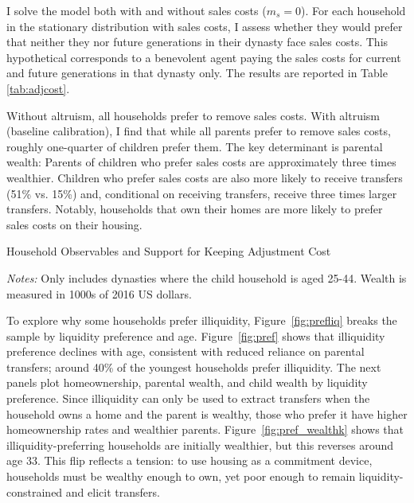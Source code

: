 \documentclass[12pt]{article}
\begin{document}
I solve the model both with and without sales costs ($m_s=0$). For each household in the stationary distribution with sales costs, I assess whether they would prefer that neither they nor future generations in their dynasty face sales costs. This hypothetical corresponds to a benevolent agent paying the sales costs for current and future generations in that dynasty only. The results are reported in Table \ref{tab:adjcost}.

Without altruism, all households prefer to remove sales costs. With altruism (baseline calibration), I find that while all parents prefer to remove sales costs, roughly one-quarter of children prefer them. The key determinant is parental wealth: Parents of children who prefer sales costs are approximately three times wealthier. Children who prefer sales costs are also more likely to receive transfers (51\% vs. 15\%) and, conditional on receiving transfers, receive three times larger transfers. Notably, households that own their homes are more likely to prefer sales costs on their housing.

\begin{table}
	\center
	\caption{Household Observables and Support for Keeping Adjustment Cost}\label{tab:adjcost}
	\begin{threeparttable}
		
		\footnotesize
		
	\end{threeparttable}
	{\begin{footnotesize}\begin{flushleft}\vspace{-0.1in}%
		\textit{Notes:} Only includes dynasties where the child household is aged 25-44. Wealth is measured in 1000s of 2016 US dollars.
	\end{flushleft}\end{footnotesize}}		
\end{table}

To explore why some households prefer illiquidity, Figure~\ref{fig:prefliq} breaks the sample by liquidity preference and age. Figure~\ref{fig:pref} shows that illiquidity preference declines with age, consistent with reduced reliance on parental transfers; around 40\% of the youngest households prefer illiquidity. The next panels plot homeownership, parental wealth, and child wealth by liquidity preference. Since illiquidity can only be used to extract transfers when the household owns a home and the parent is wealthy, those who prefer it have higher homeownership rates and wealthier parents. Figure~\ref{fig:pref_wealthk} shows that illiquidity-preferring households are initially wealthier, but this reverses around age 33. This flip reflects a tension: to use housing as a commitment device, households must be wealthy enough to own, yet poor enough to remain liquidity-constrained and elicit transfers.
\end{document}
